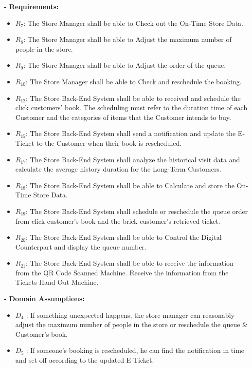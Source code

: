 \documentclass[a4paper,12pt]{report}
\begin{document}
\textbf{- Requirements:}
\begin{itemize}
	
	\item $R_7$: The Store Manager shall be able to Check out the On-Time Store Data.
	\item $R_8$: The Store Manager shall be able to Adjust the maximum number of people in the store. 
	\item $R_9$: The Store Manager shall be able to Adjust the order of the queue.
	\item $R_{10}$: The Store Manager shall be able to Check and reschedule the booking. 
	\item $R_{12}$: The Store Back-End System shall be able to received and schedule the click customers’ book. The scheduling must refer to the duration time of each Customer and the categories of items that the Customer intends to buy.
	\item $R_{15}$: The Store Back-End System shall send a notification and update the E-Ticket to the Customer when their book is rescheduled. 
	\item $R_{17}$: The Store Back-End System shall analyze the historical visit data and calculate the average history duration for the Long-Term Customers. 
	\item $R_{18}$: The Store Back-End System shall be able to Calculate and store the On-Time Store Data.
	\item $R_{19}$: The Store Back-End System shall schedule or reschedule the queue order from click customer’s book and the brick customer's retrieved ticket.
	\item $R_{20}$: The Store Back-End System shall be able to Control the Digital Counterpart and display the queue number. 
	\item $R_{21}$: The Store Back-End System shall be able to receive the information from the QR Code Scanned Machine. Receive the information from the Tickets Hand-Out Machine. 
\end{itemize}


\textbf{- Domain Assumptions:}
\begin{itemize}
	\item $D_4$ : If something unexpected happens, the store manager can reasonably adjust the maximum number of people in the store or reschedule the queue \& Customer's book.
	\item $D_5$ : If someone’s booking is rescheduled, he can find the notification in time and set off according to the updated E-Ticket.
\end{itemize}
\end{document}
